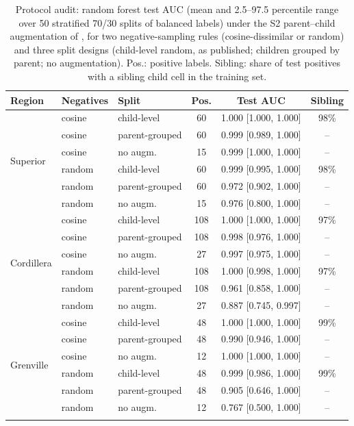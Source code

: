 \documentclass[pdflatex,sn-apa]{sn-jnl}
\begin{document}
\begin{appendices}
\begin{table}[!h]
\caption{Protocol audit: random forest test AUC (mean and 2.5--97.5 percentile range over 50 stratified 70/30 splits of balanced labels) under the S2 parent--child augmentation of \citet{Parsa2024}, for two negative-sampling rules (cosine-dissimilar or random) and three split designs (child-level random, as published; children grouped by parent; no augmentation). Pos.: positive labels. Sibling: share of test positives with a sibling child cell in the training set.}\label{tab:audit}
\scriptsize
\setlength{\tabcolsep}{2.5pt}
\begin{tabular*}{\textwidth}{@{\extracolsep\fill}lllccc}
\toprule
Region & Negatives & Split & Pos. & Test AUC & Sibling \\
\midrule
\multirow{6}{*}{Superior} & cosine & child-level & 60 & 1.000 [1.000, 1.000] & 98\% \\
 & cosine & parent-grouped & 60 & 0.999 [0.989, 1.000] & -- \\
 & cosine & no augm. & 15 & 0.999 [1.000, 1.000] & -- \\
 & random & child-level & 60 & 0.999 [0.995, 1.000] & 98\% \\
 & random & parent-grouped & 60 & 0.972 [0.902, 1.000] & -- \\
 & random & no augm. & 15 & 0.976 [0.800, 1.000] & -- \\
\midrule
\multirow{6}{*}{Cordillera} & cosine & child-level & 108 & 1.000 [1.000, 1.000] & 97\% \\
 & cosine & parent-grouped & 108 & 0.998 [0.976, 1.000] & -- \\
 & cosine & no augm. & 27 & 0.997 [0.975, 1.000] & -- \\
 & random & child-level & 108 & 1.000 [0.998, 1.000] & 97\% \\
 & random & parent-grouped & 108 & 0.961 [0.858, 1.000] & -- \\
 & random & no augm. & 27 & 0.887 [0.745, 0.997] & -- \\
\midrule
\multirow{6}{*}{Grenville} & cosine & child-level & 48 & 1.000 [1.000, 1.000] & 99\% \\
 & cosine & parent-grouped & 48 & 0.990 [0.946, 1.000] & -- \\
 & cosine & no augm. & 12 & 1.000 [1.000, 1.000] & -- \\
 & random & child-level & 48 & 0.999 [0.986, 1.000] & 99\% \\
 & random & parent-grouped & 48 & 0.905 [0.646, 1.000] & -- \\
 & random & no augm. & 12 & 0.767 [0.500, 1.000] & -- \\
\botrule
\end{tabular*}
\end{table}



\end{appendices}
\end{document}
